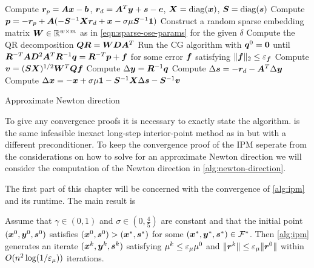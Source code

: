 \begin{algorithm}[p]
  Compute \(\bm{r}_p = \bm{A}\bm{x} - \bm{b}\), \(\bm{r}_d = \bm{A}^T \bm{y} + \bm{s} - \bm{c}\), \(\bm{X} = \operatorname{diag}(\bm{x})\), \(\bm{S} = \operatorname{diag}(\bm{s})\)\;
  Compute \(\bm{p} = -\bm{r}_p + \bm{A}(-\bm{S}^{-1}\bm{X}\bm{r}_d + \bm{x} - \sigma \mu \bm{S}^{-1} \bm{1})\)\;
  Construct a random sparse embedding matrix \(\bm{W} \in \mathbb{R}^{w \times m}\) as in \cref{eqn:sparse-ose-params} for the given \(\delta\)\;
  Compute the QR decomposition \(\bm{Q} \bm{R} = \bm{W} \bm{D} \bm{A}^T\)\;
  Run the CG algorithm with \(\bm{q}^0 = \bm{0}\) until \(\bm{R}^{-T} \bm{A} \bm{D}^2 \bm{A}^T \bm{R}^{-1} \bm{q} = \bm{R}^{-T} \bm{p} + \bm{f}\) for some error \(\bm{f}\) satisfying \(\lVert \bm{f} \rVert_2 \leq \varepsilon_{\bm{f}}\)\; \label{line:cg}
  Compute \(\bm{v} = (\bm{S} \bm{X})^{1/2} \bm{W}^T \bm{Q} \bm{f}\)\; \label{line:compute-v}
  Compute \(\Delta\bm{y} = \bm{R}^{-1}\bm{q}\)\;
  Compute \(\Delta\bm{s} = -\bm{r}_d - \bm{A}^T \Delta\bm{y}\)\;
  Compute \(\Delta\bm{x} = -\bm{x} + \sigma \mu \bm{1} - \bm{S}^{-1}\bm{X} \Delta\bm{s} - \bm{S}^{-1} \bm{v}\)\; \label{line:compute-delta-x}
  \;
  \caption{Approximate Newton direction} \label{alg:newton-direction}
\end{algorithm}

To give any convergence proofs it is necessary to exactly state the algorithm.
 is the same infeasible inexact long-step interior-point method as in \cite{Avron-FasterRandomizedInfeasibleIPMs,Monteiro-ConvergenceAnalysisLongStepInfeasibleIPMs} but with a different preconditioner.
To keep the convergence proof of the IPM seperate from the considerations on how to solve for an approximate Newton direction we will consider the computation of the Newton direction in \cref{alg:newton-direction}.

The first part of this chapter will be concerned with the convergence of \cref{alg:ipm} and its runtime.
The main result is
\begin{theorem}
Assume that \(\gamma \in (0, 1)\) and \(\sigma \in (0, \frac{4}{5})\) are constant and that the initial point \((\bm{x}^0, \bm{y}^0, \bm{s}^0)\) satisfies \((\bm{x}^0, \bm{s}^0) > (\bm{x}^*, \bm{s}^*)\) for some \((\bm{x}^*, \bm{y}^*, \bm{s}^*) \in \mathcal{F}^*\).
Then \cref{alg:ipm} generates an iterate \((\bm{x}^k, \bm{y}^k, \bm{s}^k)\) satisfying \(\mu^k \leq \varepsilon_\mu \mu^0\) and \(\lVert \bm{r}^k \rVert \leq \varepsilon_\mu \lVert \bm{r}^0 \rVert\) within \(O(n^2 \log(1/\varepsilon_\mu))\) iterations.
\end{theorem}

